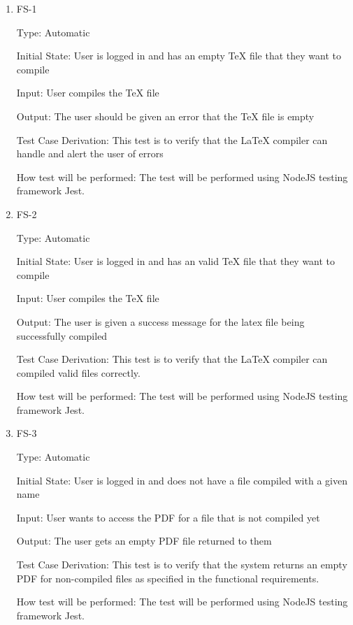 \documentclass[12pt, titlepage]{article}
\begin{document}
	\begin{enumerate}
		
		\item{FS-1\\}
		
		Type: Automatic
		
		Initial State: User is logged in and has an empty TeX file that they want to compile
		
		Input: User compiles the TeX file
		
		Output: The user should be given an error that the TeX file is empty
		
		Test Case Derivation: This test is to verify that the LaTeX compiler can handle and alert the user of errors
		
		How test will be performed: The test will be performed using NodeJS testing framework Jest.
		
		\item{FS-2\\}
		
		Type: Automatic
		
		Initial State: User is logged in and has an valid TeX file that they want to compile
		
		Input: User compiles the TeX file
		
		Output: The user is given a success message for the latex file being successfully compiled
		
		Test Case Derivation: This test is to verify that the LaTeX compiler can compiled valid files correctly.
		
		How test will be performed: The test will be performed using NodeJS testing framework Jest.
		
		\item{FS-3\\}
		
		Type: Automatic
		
		Initial State: User is logged in and does not have a file compiled with a given name
		
		Input: User wants to access the PDF for a file that is not compiled yet
		
		Output: The user gets an empty PDF file returned to them
		
		Test Case Derivation: This test is to verify that the system returns an empty PDF for non-compiled files as specified in the functional requirements.
		
		How test will be performed: The test will be performed using NodeJS testing framework Jest.
		

\end{enumerate}
\end{document}
